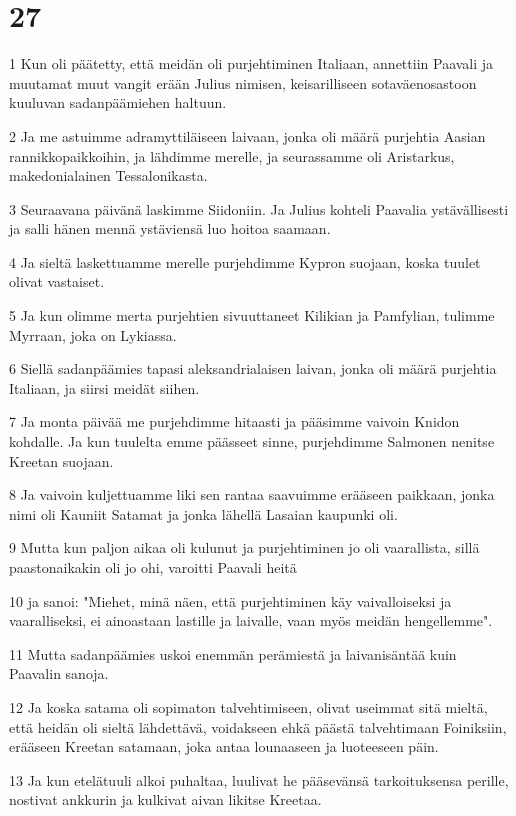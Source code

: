 \chapter{27}

\par 1 Kun oli päätetty, että meidän oli purjehtiminen Italiaan, annettiin Paavali ja muutamat muut vangit erään Julius nimisen, keisarilliseen sotaväenosastoon kuuluvan sadanpäämiehen haltuun.
\par 2 Ja me astuimme adramyttiläiseen laivaan, jonka oli määrä purjehtia Aasian rannikkopaikkoihin, ja lähdimme merelle, ja seurassamme oli Aristarkus, makedonialainen Tessalonikasta.
\par 3 Seuraavana päivänä laskimme Siidoniin. Ja Julius kohteli Paavalia ystävällisesti ja salli hänen mennä ystäviensä luo hoitoa saamaan.
\par 4 Ja sieltä laskettuamme merelle purjehdimme Kypron suojaan, koska tuulet olivat vastaiset.
\par 5 Ja kun olimme merta purjehtien sivuuttaneet Kilikian ja Pamfylian, tulimme Myrraan, joka on Lykiassa.
\par 6 Siellä sadanpäämies tapasi aleksandrialaisen laivan, jonka oli määrä purjehtia Italiaan, ja siirsi meidät siihen.
\par 7 Ja monta päivää me purjehdimme hitaasti ja pääsimme vaivoin Knidon kohdalle. Ja kun tuulelta emme päässeet sinne, purjehdimme Salmonen nenitse Kreetan suojaan.
\par 8 Ja vaivoin kuljettuamme liki sen rantaa saavuimme erääseen paikkaan, jonka nimi oli Kauniit Satamat ja jonka lähellä Lasaian kaupunki oli.
\par 9 Mutta kun paljon aikaa oli kulunut ja purjehtiminen jo oli vaarallista, sillä paastonaikakin oli jo ohi, varoitti Paavali heitä
\par 10 ja sanoi: "Miehet, minä näen, että purjehtiminen käy vaivalloiseksi ja vaaralliseksi, ei ainoastaan lastille ja laivalle, vaan myös meidän hengellemme".
\par 11 Mutta sadanpäämies uskoi enemmän perämiestä ja laivanisäntää kuin Paavalin sanoja.
\par 12 Ja koska satama oli sopimaton talvehtimiseen, olivat useimmat sitä mieltä, että heidän oli sieltä lähdettävä, voidakseen ehkä päästä talvehtimaan Foiniksiin, erääseen Kreetan satamaan, joka antaa lounaaseen ja luoteeseen päin.
\par 13 Ja kun etelätuuli alkoi puhaltaa, luulivat he pääsevänsä tarkoituksensa perille, nostivat ankkurin ja kulkivat aivan likitse Kreetaa.
